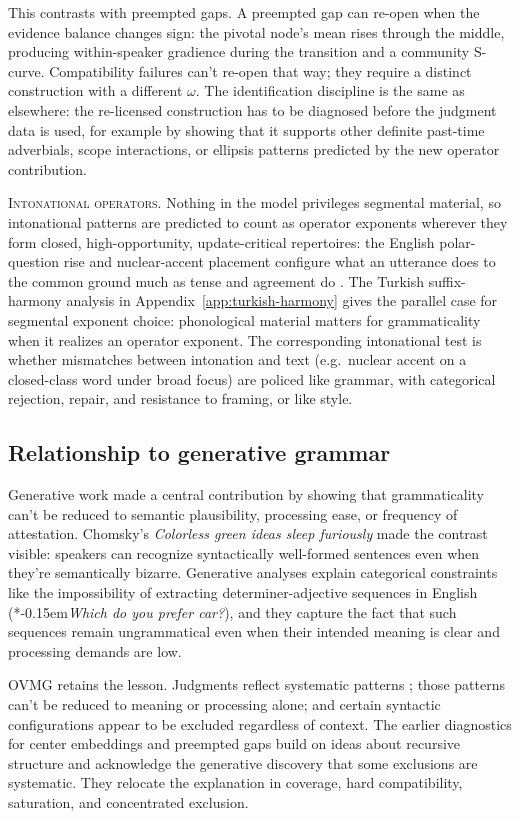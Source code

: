 \documentclass[12pt,letterpaper]{article}
\newcommand{\mention}[1]{\textit{#1}}
\newcommand{\judgesep}{\kern-0.15em}
\newcommand{\ungram}[1]{*\judgesep#1}
\newcommand{\eg}{e.g.\,\xspace}
\begin{document}
This contrasts with preempted gaps. A preempted gap can re-open when the
evidence balance changes sign: the pivotal node's mean rises through the
middle, producing within-speaker gradience during the transition and a community
S-curve.
Compatibility failures can't re-open that way; they require a distinct
construction with a different $\omega$. The identification discipline is the
same as elsewhere: the re-licensed construction has to be diagnosed before the
judgment data is used, for example by showing that it supports other definite
past-time adverbials, scope interactions, or ellipsis patterns predicted by the
new operator contribution.

\noindent\textsc{Intonational operators.} Nothing in the model privileges
segmental material, so intonational patterns are predicted to count as operator
exponents wherever they form closed, high-opportunity, update-critical
repertoires: the English polar-question rise and nuclear-accent placement
configure what an utterance does to the common ground much as tense and
agreement do \autocite{reynolds2026operators}. The Turkish suffix-harmony
analysis in Appendix~\ref{app:turkish-harmony} gives the parallel case for
segmental exponent choice: phonological material matters for grammaticality
when it realizes an operator exponent. The corresponding intonational test is
whether mismatches between intonation and text (\eg nuclear accent on a
closed-class word under broad focus) are policed like grammar, with categorical
rejection, repair, and resistance to framing, or like style.

\subsection{Relationship to generative grammar}

Generative work made a central contribution by showing that grammaticality
can't be reduced to semantic plausibility, processing ease, or frequency of
attestation. Chomsky's \mention{Colorless green ideas sleep furiously} made
the contrast visible: speakers can recognize syntactically well-formed
sentences even when they're semantically bizarre. Generative analyses explain
categorical constraints like the impossibility of extracting
determiner-adjective sequences in English (\ungram{\mention{Which do you prefer
car?}}), and they capture the fact that such sequences remain ungrammatical
even when their intended meaning is clear and processing demands are low.

OVMG retains the lesson. Judgments reflect systematic patterns
\autocite{dennett1991}; those patterns can't be reduced to meaning or processing
alone; and certain syntactic configurations appear to be excluded regardless of
context. The earlier diagnostics for center embeddings and preempted gaps build
on ideas about recursive structure and acknowledge the generative discovery that
some exclusions are systematic. They relocate the explanation in coverage, hard
compatibility, saturation, and concentrated exclusion.
\end{document}
